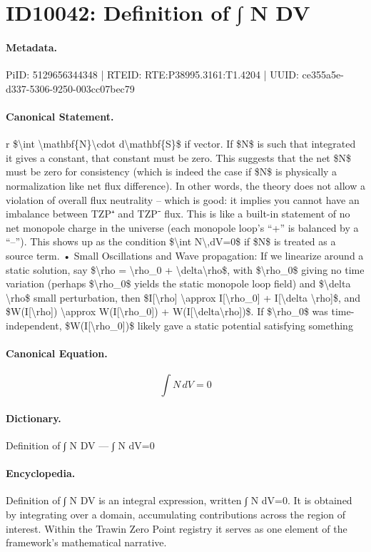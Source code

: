 \section*{ID10042: Definition of ∫ N DV}
\paragraph{Metadata.}
PiID: 5129656344348 | RTEID: RTE:P38995.3161:T1.4204 | UUID: ce355a5e-d337-5306-9250-003cc07bec79

\paragraph{Canonical Statement.}
r \$\textbackslash{}int \textbackslash{}mathbf\{N\}\textbackslash{}cdot d\textbackslash{}mathbf\{S\}\$ if vector. If \$N\$ is such that integrated it gives a constant, that constant must be zero. This suggests that the net \$N\$ must be zero for consistency (which is indeed the case if \$N\$ is physically a normalization like net flux difference). In other words, the theory does not allow a violation of overall flux neutrality – which is good: it implies you cannot have an imbalance between TZP⁺ and TZP⁻ flux. This is like a built-in statement of no net monopole charge in the universe (each monopole loop’s “+” is balanced by a “–”). This shows up as the condition \$\textbackslash{}int N\textbackslash{},dV=0\$ if \$N\$ is treated as a source term. • Small Oscillations and Wave propagation: If we linearize around a static solution, say \$\textbackslash{}rho = \textbackslash{}rho\_0 + \textbackslash{}delta\textbackslash{}rho\$, with \$\textbackslash{}rho\_0\$ giving no time variation (perhaps \$\textbackslash{}rho\_0\$ yields the static monopole loop field) and \$\textbackslash{}delta \textbackslash{}rho\$ small perturbation, then \$I[\textbackslash{}rho] \textbackslash{}approx I[\textbackslash{}rho\_0] + I[\textbackslash{}delta \textbackslash{}rho]\$, and \$W(I[\textbackslash{}rho]) \textbackslash{}approx W(I[\textbackslash{}rho\_0]) + W(I[\textbackslash{}delta\textbackslash{}rho])\$. If \$\textbackslash{}rho\_0\$ was time-independent, \$W(I[\textbackslash{}rho\_0])\$ likely gave a static potential satisfying something

\paragraph{Canonical Equation.}
\[
\int N\,dV=0
\]

\paragraph{Dictionary.}
Definition of ∫ N DV — ∫ N dV=0

\paragraph{Encyclopedia.}
Definition of ∫ N DV is an integral expression, written ∫ N dV=0. It is obtained by integrating over a domain, accumulating contributions across the region of interest. Within the Trawin Zero Point registry it serves as one element of the framework's mathematical narrative.

